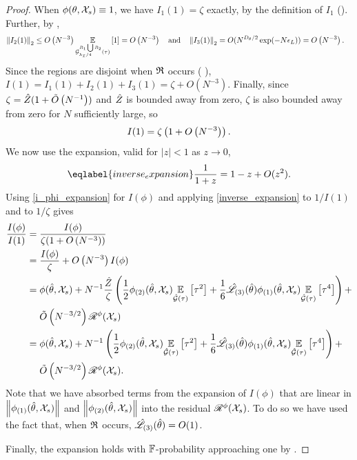 \begin{lem}
\begin{proof}
When $\phi(\theta, {\mathcal{X}}_s) \equiv 1$, we have $I_1(1) = \zeta$ exactly, by the
definition of $I_1$ (). Further, by
,
%
\begin{align*}
%
\norm{I_2(1)}_2 \le{}&
    O\left(N^{-3}\right)
    \expect{\normresid{\infoev / 4}{R_1 \bigcup R_2}(\tau)}{1}
    = O\left(N^{-3}\right)
\quad\textrm{and}\quad
\norm{I_3(1)}_2 = O(N^{\thetadim/2} \exp(-N \epsilon_L)) = O\left(N^{-3}\right).
%
\end{align*}
%
Since the regions are disjoint when $\mathfrak{R}$ occurs (
), $I(1) = I_1(1) + I_2(1) + I_3(1) = \zeta +
O(N^{-3})$. Finally, since $\zeta = \hat{Z}(1 + \tilde{O}\left(N^{-1}\right))$ and
$\hat{Z}$ is bounded away from zero, $\zeta$ is also bounded away from zero
for $N$ sufficiently large, so
%
\begin{align*}
%
I(1) = \zeta\left(1 + \ord{N^{-3}}\right).
%
\end{align*}
%
We now use the expansion, valid for $|z| < 1$ as $z \rightarrow 0$,
%
\begin{align}\eqlabel{inverse_expansion}
    \frac{1}{1 + z} = 1 - z + O(z^2).
\end{align}
%
Using \eqref{i_phi_expansion} for $I(\phi)$ and
applying \eqref{inverse_expansion} to $1 / I(1)$ and to $1 / \zeta$
gives
%
\begin{align*}
%
\frac{I(\phi)}{I(1)} ={}&
\frac{I(\phi)}{\zeta( 1 + \ord{N^{-3}})} \\
={}& \frac{I(\phi)}{\zeta} + \ord{N^{-3}} I(\phi) \\
={}&
\phi(\thetahat, \xvec_s) +
N^{-1} \frac{\normalizer}{\zeta} \left(
    \frac{1}{2} \phigrad{2}(\thetahat, \xvec_s) \expect{\normhat}{\tau^2} +
    \frac{1}{6} \likhatk{3}(\thetahat) \phigrad{1}(\thetahat, \xvec_s)
        \expect{\normhat}{\tau^4} \right) +
\\&
\ordlog{N^{-3/2}} \resid{\phi}(\xvec_s)
\\={}&
\phi(\thetahat, \xvec_s) +
N^{-1} \left(
    \frac{1}{2} \phigrad{2}(\thetahat, \xvec_s) \expect{\normhat}{\tau^2} +
    \frac{1}{6} \likhatk{3}(\thetahat) \phigrad{1}(\thetahat, \xvec_s)
        \expect{\normhat}{\tau^4} \right) +
\\&
\ordlog{N^{-3/2}} \resid{\phi}(\xvec_s).
%
\end{align*}
%
Note that we have absorbed terms from the expansion of $I(\phi)$ that are linear
in $\left\Vert \phi_{(1)}(\hat\theta, {\mathcal{X}}_s)\right\Vert$ and $\left\Vert \phi_{(2)}(\hat\theta, {\mathcal{X}}_s)\right\Vert$
into the residual $\mathscr{R}^{\phi}({\mathcal{X}}_s)$.
To do so we have used the fact that, when $\mathfrak{R}$ occurs,
$\hat{\mathscr{L}}_{(3)}(\hat\theta) = O(1)$.

Finally, the expansion holds with $\mathbb{F}$-probability approaching one by
.
%
\end{proof}
%
\end{lem}
%
